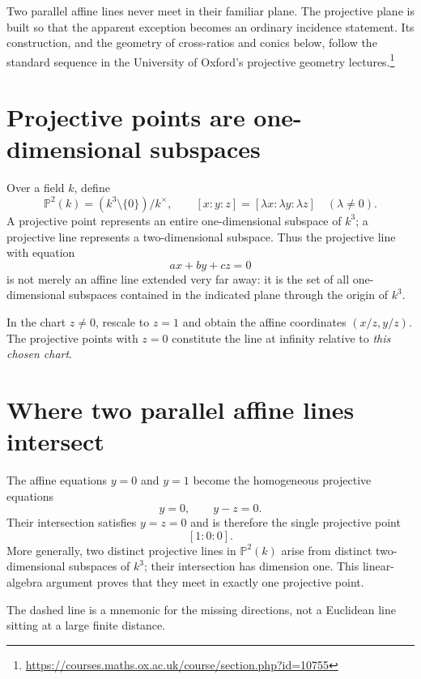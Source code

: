 
Two parallel affine lines never meet in their familiar plane. The projective plane is built so that the apparent exception becomes an ordinary incidence statement. Its construction, and the geometry of cross-ratios and conics below, follow the standard sequence in the University of Oxford's projective geometry lectures.\footnote{\url{https://courses.maths.ox.ac.uk/course/section.php?id=10755}}

\section{Projective points are one-dimensional subspaces}

Over a field \(k\), define
\[
 \mathbb P^2(k)=(k^3\setminus\{0\})/k^\times,
 \qquad [x:y:z]=[\lambda x:\lambda y:\lambda z]\quad(\lambda\ne0).
\]
A projective point represents an entire one-dimensional subspace of \(k^3\); a projective line represents a two-dimensional subspace. Thus the projective line with equation
\[
 ax+by+cz=0
\]
is not merely an affine line extended very far away: it is the set of all one-dimensional subspaces contained in the indicated plane through the origin of \(k^3\).

In the chart \(z\ne0\), rescale to \(z=1\) and obtain the affine coordinates \((x/z,y/z)\). The projective points with \(z=0\) constitute the line at infinity relative to \emph{this chosen chart}.

\section{Where two parallel affine lines intersect}

The affine equations \(y=0\) and \(y=1\) become the homogeneous projective equations
\[
 y=0,\qquad y-z=0.
\]
Their intersection satisfies \(y=z=0\) and is therefore the single projective point
\[
 [1:0:0].
\]
More generally, two distinct projective lines in \(\mathbb P^2(k)\) arise from distinct two-dimensional subspaces of \(k^3\); their intersection has dimension one. This linear-algebra argument proves that they meet in exactly one projective point.

\begin{center}
\end{center}
The dashed line is a mnemonic for the missing directions, not a Euclidean line sitting at a large finite distance.

